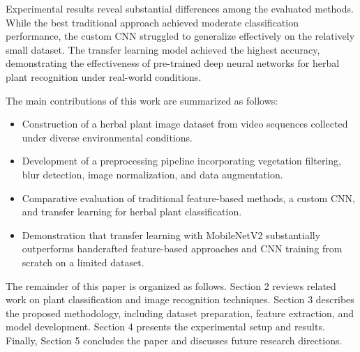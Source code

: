Experimental results reveal substantial differences among the evaluated methods. While the best traditional approach achieved moderate classification performance, the custom CNN struggled to generalize effectively on the relatively small dataset. The transfer learning model achieved the highest accuracy, demonstrating the effectiveness of pre-trained deep neural networks for herbal plant recognition under real-world conditions.

The main contributions of this work are summarized as follows:

\begin{itemize}
\item Construction of a herbal plant image dataset from video sequences collected under diverse environmental conditions.

\item Development of a preprocessing pipeline incorporating vegetation filtering, blur detection, image normalization, and data augmentation.

\item Comparative evaluation of traditional feature-based methods, a custom CNN, and transfer learning for herbal plant classification.

\item Demonstration that transfer learning with MobileNetV2 substantially outperforms handcrafted feature-based approaches and CNN training from scratch on a limited dataset.

\end{itemize}

The remainder of this paper is organized as follows. Section 2 reviews related work on plant classification and image recognition techniques. Section 3 describes the proposed methodology, including dataset preparation, feature extraction, and model development. Section 4 presents the experimental setup and results. Finally, Section 5 concludes the paper and discusses future research directions.

